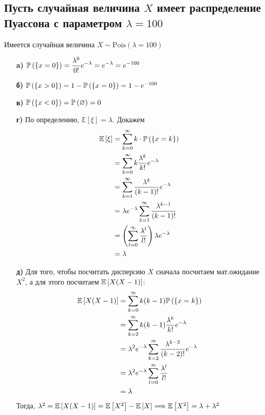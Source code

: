 \documentclass{article}
\begin{document}
\subsection{Пусть случайная величина $X$ имеет распределение Пуассона с параметром $\lambda= 100$}
Имеется случайная величина $X\sim\text{Pois}(\lambda=100)$
\begin{enumerate}
    \item[\textbf{a)}] $\mathbb{P}\left(\{x=0\}\right)=\displaystyle\frac{\lambda^0}{0!}e^{-\lambda}=e^{-\lambda}=e^{-100}$
    \item[\textbf{б)}] $\mathbb{P}\left(\{x>0\}\right)=1-\mathbb{P}\left(\{x=0\}\right)=1-e^{-100}$
    \item[\textbf{в)}] $\mathbb{P}\left(\{x<0\}\right)=\mathbb{P}\left(\varnothing\right)=0$
    \item[\textbf{г)}] По определению, $\mathbb{E}\left[\xi\right]=\lambda$. Докажем
    \begin{equation*}
        \begin{aligned}
            \matwait{\xi}&=\sum_{k=0}^{\infty} k\cdot\prob{\{x=k\}}\\
            &=\sum_{k=0}^{\infty} k\frac{\lambda^k}{k!}e^{-\lambda}\\
            &=\sum_{k=1}^{\infty} \frac{\lambda^k}{(k-1)!}e^{-\lambda}\\
            &=\lambda e^{-\lambda}\sum_{k=1}^{\infty}\frac{\lambda^{k-1}}{(k-1)!}\\
            &=\left(\sum_{l=0}^{\infty}\frac{\lambda^l}{l!}\right)\lambda e^{-\lambda}\\
            &=\lambda
        \end{aligned}
    \end{equation*}
    \item[\textbf{д)}] Для того, чтобы посчитать дисперсию $X$ сначала посчитаем мат.ожидание $X^2$, а для этого посчитаем $\mathbb{E}\left[X(X-1)\right]$:
    \begin{equation*}
        \begin{aligned}
            \matwait{X(X-1)}&=\sum_{k=0}^{\infty} k(k-1)\prob{\{x=k\}}\\
            &=\sum_{k=2}^{\infty} k(k-1)\frac{\lambda^k}{k!}e^{-\lambda}\\
            &=\lambda^2e^{-\lambda}\sum_{k=2}^{\infty}\frac{\lambda^{k-2}}{(k-2)!}e^{-\lambda}\\
            &=\lambda^2e^{-\lambda}\sum_{l=0}^{\infty}\frac{\lambda^{l}}{l!}\\
            &=\lambda
        \end{aligned}
    \end{equation*}
    Тогда, $\lambda^2=\mathbb{E}\left[X(X-1)\right]=\mathbb{E}\left[X^2\right]-\mathbb{E}\left[X\right]\Longrightarrow\mathbb{E}\left[X^2\right]=\lambda+\lambda^2$
    

\end{enumerate}
\end{document}
